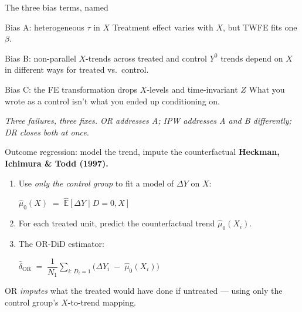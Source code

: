 \documentclass[aspectratio=169,11pt]{beamer}
\begin{document}
\begin{frame}{The three bias terms, named}
\footnotesize
\begin{block}{Bias A: heterogeneous $\tau$ in $X$}
Treatment effect varies with $X$, but TWFE fits one $\beta$. \;
\end{block}
\begin{block}{Bias B: non-parallel $X$-trends across treated and control}
$Y^0$ trends depend on $X$ in different ways for treated vs.\ control. \;
\end{block}
\begin{block}{Bias C: the FE transformation drops $X$-levels and time-invariant $Z$}
What you wrote as a control isn't what you ended up conditioning on. \;
\end{block}
\begin{center}
\footnotesize\color{warmgray}\itshape
Three failures, three fixes. \;OR addresses A; IPW addresses A and B differently; DR closes both at once.
\end{center}
\end{frame}

\begin{frame}{Outcome regression: model the trend, impute the counterfactual}
\vspace{0.5em}
\textbf{Heckman, Ichimura \& Todd (1997).}
\vspace{0.4em}
\begin{enumerate}
  \item Use \textit{only the control group} to fit a model of $\Delta Y$ on $X$:
  \begin{center}\small $\widehat{\mu}_0(X) \;=\; \widehat{\mathbb{E}}[\Delta Y \mid D{=}0, X]$ \end{center}
  \item For each treated unit, predict the counterfactual trend $\widehat{\mu}_0(X_i)$.
  \item The OR-DiD estimator:
  \begin{center}
  \small
  $\widehat{\delta}_{\text{OR}} \;=\; \dfrac{1}{N_1}\displaystyle\sum_{i:\, D_i=1}\big(\Delta Y_i \;-\; \widehat{\mu}_0(X_i)\big)$
  \end{center}
\end{enumerate}
\vspace{0.4em}
 OR \textit{imputes} what the treated would have done if untreated --- using only the control group's $X$-to-trend mapping.
\end{frame}
\end{document}
